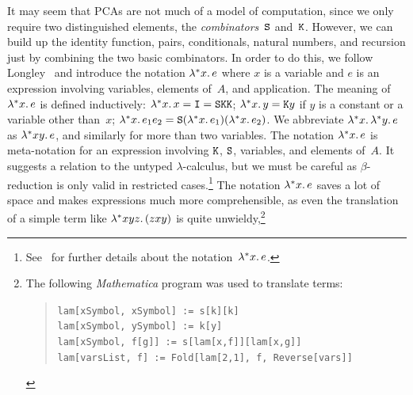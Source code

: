 It may seem that PCAs are not much of a model of computation, since we
only require two distinguished elements, the
%
%
%
%
%
%
%
\emph{combinators}~$\mathtt{S}$ and~$\mathtt{K}$. However, we can build up the
identity function, pairs, conditionals, natural numbers, and recursion
just by combining the two basic combinators. In order to do this, we
follow Longley~\cite{Longley:94} and introduce the notation
$\lambda^{*} x .\,e$ where $x$ is a variable and $e$ is an expression
involving variables, elements of~$A$, and application. The meaning
of $\lambda^{*} x .\,e$ is defined inductively:
%
\label{sym:pcalam}%
%
%
\label{sym:combI}%
%
$\lambda^{*} x .\,x = \mathtt{I} =
\mathtt{S} \mathtt{K} \mathtt{K}$; $\lambda^{*} x .\,y = \mathtt{K} y$ if $y$ is a constant
or a variable other than~$x$; $\lambda^{*} x .\,e_1 e_2 = \mathtt{S}
(\lambda^{*} x .\,e_1) (\lambda^{*} x .\,e_2)$. We abbreviate
$\lambda^{*} x .\,\lambda^{*} y .\,e$ as $\lambda^{*} x y .\,e$, and similarly for
more than two variables. The notation $\lambda^{*} x .\,e$ is meta-notation
for an expression involving $\mathtt{K}$, $\mathtt{S}$, variables, and
elements of~$A$. It suggests a relation to the untyped
$\lambda$-calculus, but we must be careful as $\beta$-reduction is
only valid in restricted cases.\footnote{
%
  See~\cite[Chapter~1]{Longley:94} for further details about the
  notation~$\lambda^{*} x .\,e$.
%
}
%
The notation $\lambda^{*} x .\,e$ saves a lot of space and makes
expressions much more comprehensible, as even the translation of a
simple term like $\lambda^{*} x y z .\,(z x y)$ is quite unwieldy,\footnote{
%
  The following \emph{Mathematica} program was used to translate terms:
  \begin{quotation}\small
  \noindent
  \texttt{lam[x{}Symbol, x{}Symbol] := s[k][k]}\\
  \texttt{lam[x{}Symbol, y{}Symbol] := k[y]}\\
  \texttt{lam[x{}Symbol, f{}[g{}]] := s[lam[x,f]][lam[x,g]]}\\
  \texttt{lam[vars{}List, f{}] :=
    Fold[lam[{}2,{}1]{}, f, Reverse[vars]]}
  \end{quotation}
}
%
